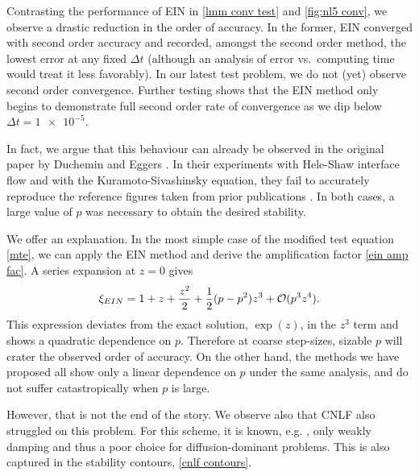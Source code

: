 Contrasting the performance of EIN in \cref{lmm conv test} and \cref{fig:nl5 conv}, we observe a drastic reduction in the order of accuracy. In the former, EIN converged with second order accuracy and recorded, amongst the second order method, the lowest error at any fixed $\Delta t$ (although an analysis of error vs.\ computing time would treat it less favorably). In our latest test problem, we do not (yet) observe second order convergence. Further testing shows that the EIN method only begins to demonstrate full second order rate of convergence as we dip below $\Delta t=\num{1e-5}$.

In fact, we argue that this behaviour can already be observed in the original paper by Duchemin and Eggers \cite{duchemin2014explicit}. In their experiments with Hele-Shaw interface flow and with the Kuramoto-Sivashinsky equation, they fail to accurately reproduce the reference figures taken from prior publications \cite{hou1994removing,kassam2005fourth}. In both cases, a large value of $p$ was necessary to obtain the desired stability. 

We offer an explanation. In the most simple case of the modified test equation \cref{mte}, we can apply the EIN method and derive the amplification factor \cref{ein amp fac}. A series expansion at $z=0$ gives 
\begin{align}
        \xi_{EIN}
= 1 + z + \frac{z^2}{2} + \frac{1}{2}(p-p^2)z^3 + \mathcal{O}(p^3z^4).
\end{align}
This expression deviates from the exact solution, $\exp(z)$, in the $z^3$ term  and shows a quadratic dependence on $p$. Therefore at coarse step-sizes, sizable $p$ will crater the observed order of accuracy. 
On the other hand, the methods we have proposed all show only a linear dependence on $p$ under the same analysis, and do not suffer catastropically when $p$ is large.

However, that is not the end of the story. We observe also that CNLF also struggled on this problem. For this scheme, it is known, e.g. \cite{ascher1995implicit}, only weakly damping and thus a poor choice for diffusion-dominant problems. This is also captured in the stability contours, \cref{cnlf contours}.
